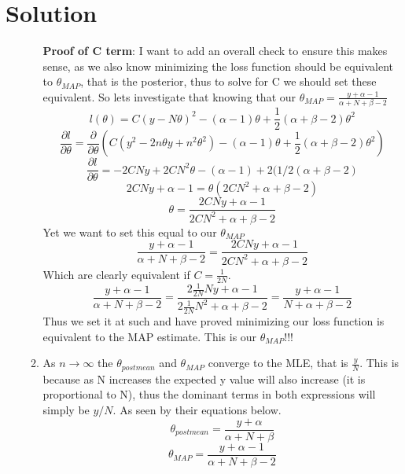 \documentclass[submit]{harvardml}
\newenvironment{answer}
  {\section*{Solution}}
{}
\begin{document}
\begin{answer}
\begin{enumerate}
\begin{enumerate}
              \textbf{Proof of C term}: I want to add an overall check to ensure this makes sense, as we also know minimizing the loss function should be equivalent to $\theta_{MAP}$, that is the posterior, thus to solve for C we should set these equivalent. So lets investigate that knowing that our $\theta_{MAP} = \frac{y+\alpha-1}{\alpha+N+\beta-2}$
              $$l(\theta) = C(y-N\theta)^2 -(\alpha -1)\theta +\frac{1}{2}(\alpha+\beta-2)\theta^2$$
              $$\frac{\partial l}{\partial \theta} = \frac{\partial}{\partial \theta}(C(y^2-2n\theta y +n^2\theta^2)-(\alpha -1)\theta +\frac{1}{2}(\alpha+\beta-2)\theta^2)$$
              $$\frac{\partial l}{\partial \theta} = -2CNy+2CN^2\theta-(\alpha-1)+2(1/2(\alpha + \beta -2)$$
              $$2CNy + \alpha -1= \theta(2CN^2+\alpha + \beta -2)$$
              $$\theta = \frac{2CNy+\alpha -1}{2CN^2+\alpha + \beta -2}$$
              Yet we want to set this equal to our $\theta_{MAP}$
              $$\frac{y+\alpha-1}{\alpha+N+\beta-2} = \frac{2CNy+\alpha -1}{2CN^2+\alpha + \beta -2}$$
              Which are clearly equivalent if $C = \frac{1}{2N}$. 
              $$\frac{y+\alpha-1}{\alpha+N+\beta-2} = \frac{2\frac{1}{2N}Ny+\alpha -1}{2\frac{1}{2N}N^2+\alpha + \beta -2} = \frac{y+\alpha-1}{N+\alpha+\beta-2}$$
              Thus we set it at such and have proved minimizing our loss function is equivalent to the MAP estimate. 
              This is our $\theta_{MAP}$!!!
              
        \item As $n\rightarrow \infty$ the $\theta_{post mean}$ and $\theta_{MAP}$ converge to the MLE, that is $\frac{y}{N}$. This is because as N increases the expected y value will also increase (it is proportional to N), thus the dominant terms in both expressions will simply be $y/N$. As seen by their equations below.
        $$\theta_{postmean} = \frac{y+\alpha}{\alpha + N + \beta}$$
        $$ \theta_{MAP} = \frac{y+\alpha - 1}{\alpha+N+\beta-2}$$

      \end{enumerate}

  \end{enumerate}
\end{answer}


\newpage

\end{document}
